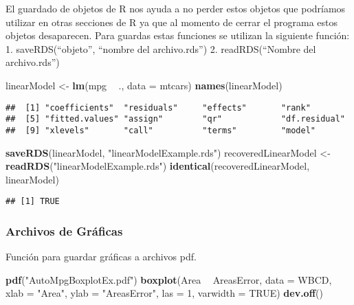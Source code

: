 \documentclass[]{article}
\newenvironment{Shaded}{\begin{snugshade}}{\end{snugshade}}
\newcommand{\DataTypeTok}[1]{\textcolor[rgb]{0.13,0.29,0.53}{#1}}
\newcommand{\DecValTok}[1]{\textcolor[rgb]{0.00,0.00,0.81}{#1}}
\newcommand{\KeywordTok}[1]{\textcolor[rgb]{0.13,0.29,0.53}{\textbf{#1}}}
\newcommand{\NormalTok}[1]{#1}
\newcommand{\OperatorTok}[1]{\textcolor[rgb]{0.81,0.36,0.00}{\textbf{#1}}}
\newcommand{\OtherTok}[1]{\textcolor[rgb]{0.56,0.35,0.01}{#1}}
\newcommand{\StringTok}[1]{\textcolor[rgb]{0.31,0.60,0.02}{#1}}
\begin{document}
El guardado de objetos de R nos ayuda a no perder estos objetos que
podríamos utilizar en otras secciones de R ya que al momento de cerrar
el programa estos objetos desaparecen. Para guardas estas funciones se
utilizan la siguiente función: 1. saveRDS(``objeto'', ``nombre del
archivo.rds'') 2. readRDS(``Nombre del archivo.rds'')

\begin{Shaded}
\begin{Highlighting}[]
\NormalTok{linearModel <-}\StringTok{ }\KeywordTok{lm}\NormalTok{(mpg }\OperatorTok{~}\StringTok{ }\NormalTok{., }\DataTypeTok{data =}\NormalTok{ mtcars)}
\KeywordTok{names}\NormalTok{(linearModel)}
\end{Highlighting}
\end{Shaded}

\begin{verbatim}
##  [1] "coefficients"  "residuals"     "effects"       "rank"         
##  [5] "fitted.values" "assign"        "qr"            "df.residual"  
##  [9] "xlevels"       "call"          "terms"         "model"
\end{verbatim}

\begin{Shaded}
\begin{Highlighting}[]
\KeywordTok{saveRDS}\NormalTok{(linearModel, }\StringTok{"linearModelExample.rds"}\NormalTok{)}
\NormalTok{recoveredLinearModel <-}\StringTok{ }\KeywordTok{readRDS}\NormalTok{(}\StringTok{"linearModelExample.rds"}\NormalTok{)}
\KeywordTok{identical}\NormalTok{(recoveredLinearModel, linearModel)}
\end{Highlighting}
\end{Shaded}

\begin{verbatim}
## [1] TRUE
\end{verbatim}

\hypertarget{archivos-de-gruxe1ficas}{%
\subsubsection{Archivos de Gráficas}\label{archivos-de-gruxe1ficas}}

Función para guardar gráficas a archivos pdf.

\begin{Shaded}
\begin{Highlighting}[]
\KeywordTok{pdf}\NormalTok{(}\StringTok{"AutoMpgBoxplotEx.pdf"}\NormalTok{)}
  \KeywordTok{boxplot}\NormalTok{(Area }\OperatorTok{~}\StringTok{ }\NormalTok{AreasError, }\DataTypeTok{data =}\NormalTok{ WBCD,}
          \DataTypeTok{xlab =} \StringTok{"Area"}\NormalTok{, }\DataTypeTok{ylab =} \StringTok{"AreasError"}\NormalTok{,}
          \DataTypeTok{las =} \DecValTok{1}\NormalTok{, }\DataTypeTok{varwidth =} \OtherTok{TRUE}\NormalTok{)}
\KeywordTok{dev.off}\NormalTok{()}
\end{Highlighting}
\end{Shaded}
\end{document}
